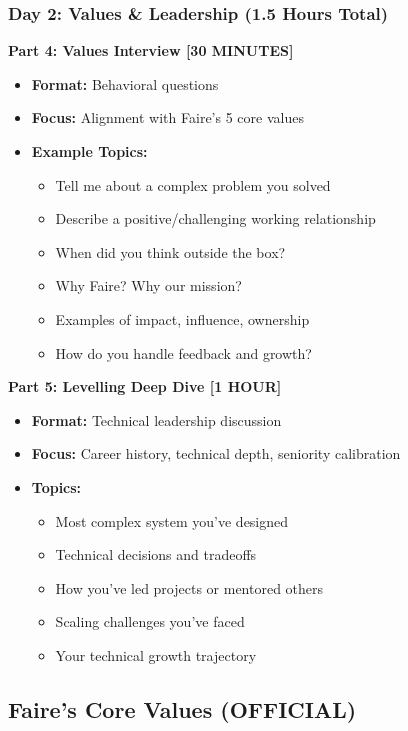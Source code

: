 \documentclass[11pt,letterpaper]{article}
\begin{document}
\subsubsection{Day 2: Values \& Leadership (1.5 Hours Total)}

\textbf{Part 4: Values Interview [30 MINUTES]}
\begin{itemize}
    \item \textbf{Format:} Behavioral questions
    \item \textbf{Focus:} Alignment with Faire's 5 core values
    \item \textbf{Example Topics:}
    \begin{itemize}
        \item Tell me about a complex problem you solved
        \item Describe a positive/challenging working relationship
        \item When did you think outside the box?
        \item Why Faire? Why our mission?
        \item Examples of impact, influence, ownership
        \item How do you handle feedback and growth?
    \end{itemize}
\end{itemize}

\textbf{Part 5: Levelling Deep Dive [1 HOUR]}
\begin{itemize}
    \item \textbf{Format:} Technical leadership discussion
    \item \textbf{Focus:} Career history, technical depth, seniority calibration
    \item \textbf{Topics:}
    \begin{itemize}
        \item Most complex system you've designed
        \item Technical decisions and tradeoffs
        \item How you've led projects or mentored others
        \item Scaling challenges you've faced
        \item Your technical growth trajectory
    \end{itemize}
\end{itemize}

\subsection{Faire's Core Values (OFFICIAL)}
\end{document}
